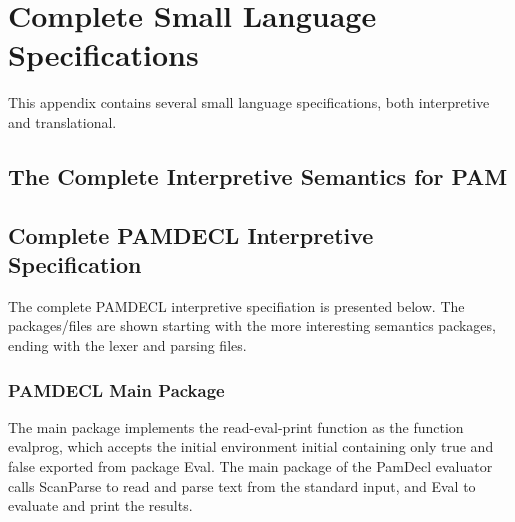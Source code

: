 \documentclass[10.5pt,a4]{article}
\begin{document}
\appendix

\begin{comment}
\section{Dummy}
...

\section{A lot of stuff is missing here compared to the book...}
\subsection{Interface to the Standard MetaModelica Package}

\end{comment}

\addtocounter{section}{2}

\section{Complete Small Language Specifications}
This appendix contains several small language specifications, both interpretive and translational.

\subsection{The Complete Interpretive Semantics for PAM}
\label{listings:pam}


\subsection{Complete PAMDECL Interpretive Specification}
The complete PAMDECL interpretive specifiation is presented below. The packages/files are shown starting with the more interesting semantics packages, ending with the lexer and parsing files.

\label{listings:pamdecl}

\subsubsection{PAMDECL Main Package}
The main package implements the read-eval-print function as the function evalprog, which accepts the initial environment initial containing only true and false exported from package Eval.
The main package of the PamDecl evaluator calls ScanParse to read and parse text from the standard input, and Eval to evaluate and print the results.

\end{document}
